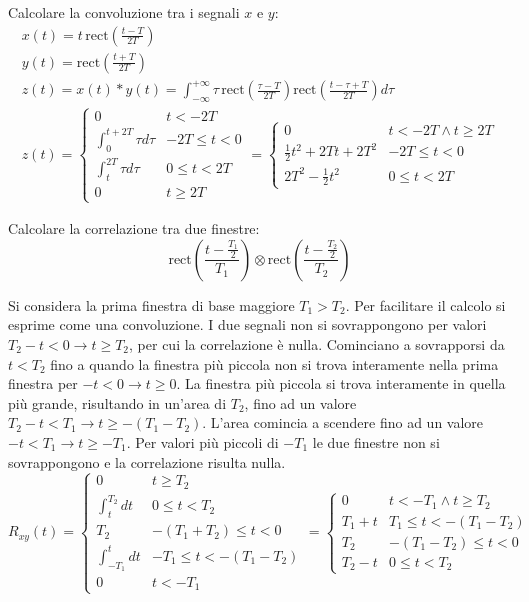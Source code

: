 \documentclass{article}
\numberwithin{equation}{subsection}
\begin{document}
Calcolare la convoluzione tra i segnali $x$ e $y$:
\begin{gather*}
    x(t)=\displaystyle t\,\mbox{rect}\left(\frac{t-T}{2T}\right)\\
    y(t)=\displaystyle\mbox{rect}\left(\frac{t+T}{2T}\right)\\
    z(t)=x(t)*y(t)=\displaystyle\int_{-\infty}^{+\infty}\tau\,\mbox{rect}\left(\frac{\tau-T}{2T}\right)\mbox{rect}\left(\frac{t-\tau+T}{2T}\right)d\tau\\
    z(t)=\begin{cases}
        0&t<-2T\\
        \displaystyle\int_{0}^{t+2T}\tau d\tau&-2T\leq t<0\\
        \displaystyle\int_{t}^{2T}\tau d\tau&0\leq t<2T\\
        0&t\geq2T
    \end{cases}=\begin{cases}
        0&t<-2T\land t\geq2T\\
        \displaystyle\frac{1}{2}t^2+2Tt+2T^2&-2T\leq t<0\\
        \displaystyle2T^2-\frac{1}{2}t^2&0\leq t<2T
    \end{cases}
\end{gather*}


Calcolare la correlazione tra due finestre:
\begin{equation*}
    \mbox{rect}\displaystyle\left(\frac{t-\frac{T_1}{2}}{T_1}\right)\otimes\mbox{rect}\left(\frac{t-\frac{T_2}{2}}{T_2}\right)
\end{equation*}

Si considera la prima finestra di base maggiore $T_1>T_2$. Per facilitare il calcolo si esprime come una convoluzione. I due segnali non si sovrappongono per valori 
$T_2-t<0\to t\geq T_2$, per cui la correlazione è nulla. Cominciano a sovrapporsi da $t<T_2$ fino a quando la finestra più piccola non si trova interamente nella prima 
finestra per $-t<0\to t\geq0$. La finestra più piccola si trova interamente in quella più grande, risultando in un'area di $T_2$, fino ad un valore 
$T_2-t<T_1\to t\geq -(T_1-T_2)$. L'area comincia a scendere fino ad un valore $-t<T_1\to t\geq -T_1$. Per valori più piccoli di $-T_1$ le due finestre non si sovrappongono e la 
correlazione risulta nulla.
\begin{equation*}
    R_{xy}(t)=\begin{cases}
        0&t\geq T_2\\
        \displaystyle\int_t^{T_2}dt& 0\leq t<T_2\\
        T_2& -(T_1+T_2)\leq t<0\\
        \displaystyle\int_{-T_1}^tdt& -T_1\leq t<-(T_1-T_2)\\
        0&t<-T_1
    \end{cases}=\begin{cases}
        0& t<-T_1\land t\geq T_2\\
        T_1+t& T_1\leq t<-(T_1-T_2)\\
        T_2& -(T_1-T_2)\leq t<0\\
        T_2-t &  0\leq t<T_2
    \end{cases}
\end{equation*}
\end{document}

